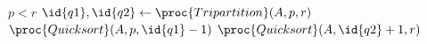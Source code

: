 \begin{codebox}
    \li \If $p < r$
    \li 	\Then
                $\id{q1},\id{q2} \gets \proc{Tripartition}(A,p,r)$
    \li 		$\proc{Quicksort}(A,p,\id{q1}-1)$
    \li 		$\proc{Quicksort}(A,\id{q2}+1,r)$
            \End
\end{codebox} 